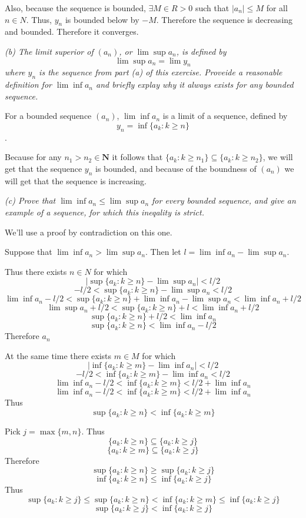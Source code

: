 \documentclass[11pt,oneside,titlepage]{book}
\begin{document}
Also, because the sequence is bounded, $\exists M \in R > 0$ such that
$|a_n| \leq M$ for all $n \in N$. Thus, $y_n$ is bounded below by $-M$.
Therefore the sequence is decreasing and bounded. Therefore it converges.

\textit{(b) The limit superior of $(a_n)$, or $\lim\sup a_n$, is defined by}
$$\lim \sup a_n = \lim y_n$$
\textit{where $y_n$ is the sequence from part (a) of this exercise. Proveide
  a reasonable definition for $\lim\inf a_n$ and briefly explay why it always
  exists for any bounded sequence.}

For a bounded sequence $(a_n)$, $\lim\inf a_n$ is a limit of a sequence,
defined by
$$y_n = \inf\{a_k: k \geq n\}$$.

Because for any $n_1 > n_2 \in \textbf{N}$ it follows that
$\{a_k: k \geq n_1\} \subseteq \{a_k: k \geq n_2\}$, we
will get that the sequence $y_n$ is bounded, and because of the
boundness of $(a_n)$ we will get that the sequence is increasing.

\textit {(c) Prove that $\lim\inf a_n \leq \lim \sup a_n$ for every bounded
  sequence, and give an example of a sequence, for which this ineqality is
  strict.}

We'll use a proof by contradiction on this one.

Suppose that $\lim\inf a_n > \lim \sup a_n$. Then let $l = \lim\inf a_n -
\lim \sup a_n$.

Thus there exists $n \in N$ for which
$$|\sup\{a_k: k \geq n\} - \lim\sup a_n| < l/2$$
$$-l/2 < \sup\{a_k: k \geq n\} - \lim\sup a_n < l/2$$
$$ \lim\inf a_n - l/2 < \sup\{a_k: k \geq n\} + \lim\inf a_n - \lim\sup a_n <\lim\inf a_n +  l/2$$
$$ \lim\sup a_n + l/2 < \sup\{a_k: k \geq n\} + l < \lim\inf a_n + l/2$$
$$  \sup\{a_k: k \geq n\} + l/2 < \lim\inf a_n $$
$$  \sup\{a_k: k \geq n\} < \lim\inf a_n - l/2$$
Therefore $a_n $

At the same time there exists $m \in M$ for which
$$|\inf\{a_k: k \geq m\} - \lim\inf a_n| < l/2$$
$$-l/2 < \inf\{a_k: k \geq m\} - \lim\inf a_n < l/2$$
$$\lim\inf a_n -l/2 < \inf\{a_k: k \geq m\}  < l/2 + \lim\inf a_n$$
$$\lim\inf a_n - l/2 < \inf\{a_k: k \geq m\}  <  l/2 + \lim\inf a_n$$
Thus
$$  \sup\{a_k: k \geq n\} < \inf\{a_k: k \geq m\}$$

Pick $j = \max\{m, n\}$.  Thus 
$$\{a_k: k \geq n\} \subseteq \{a_k: k \geq j\}$$
$$\{a_k: k \geq m\} \subseteq \{a_k: k \geq j\}$$
Therefore
$$ \sup\{a_k: k \geq n\} \geq \sup \{a_k: k \geq j\}$$
$$ \inf\{a_k: k \geq n\} \leq \inf \{a_k: k \geq j\}$$
Thus 
$$ \sup \{a_k: k \geq j\} \leq \sup\{a_k: k \geq n\} < \inf\{a_k: k \geq m\}
\leq \inf \{a_k: k \geq j\} $$
$$ \sup \{a_k: k \geq j\} <  \inf \{a_k: k \geq j\} $$
\end{document}

